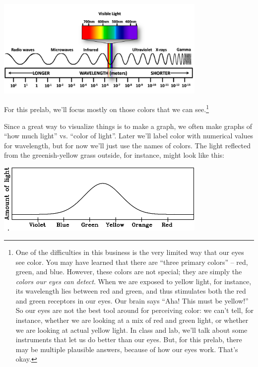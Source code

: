\documentclass[11pt]{article}
\begin{document}
\begin{center}
\includegraphics[width=4in]{linear-spectrum.jpg}
\end{center}

For this prelab, we'll focus mostly on those colors that we can see.\footnote{One of the difficulties in this business is the very limited way that our eyes see color. You may have learned that there are ``three primary colors'' -- red, green, and blue. However, these colors are not special; they are simply the {\it colors our eyes
can detect}. When we are exposed to yellow light, for instance, its wavelength lies between red and green, and thus stimulates both the red and green receptors in our eyes. Our brain says ``Aha! This must be yellow!'' So our eyes are not the best tool around
for perceiving color: we can't tell, for instance, whether we are looking at a mix of red and green light, or whether we are looking at actual yellow light. In class and lab, we'll talk about some instruments that let us do better than our eyes. But, for this prelab,
there may be multiple plausible answers, because of how our eyes work. That's okay.}

Since a great way to visualize things is to make a graph, we often make graphs of ``how much light'' vs. ``color of light''. Later we'll label color with numerical values for wavelength, but for now we'll just use the names of colors. The light reflected from the 
greenish-yellow grass outside, for instance, might look like this:


\begin{center}
\includegraphics[width=4in]{green-yellow-crop.pdf}
\end{center}
\end{document}
